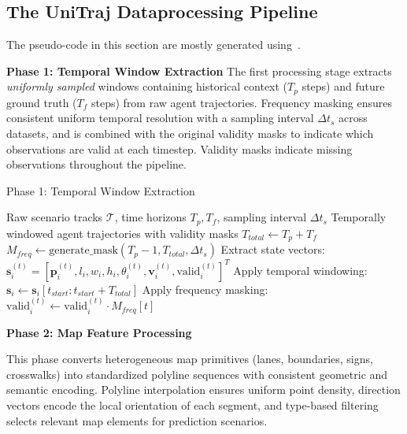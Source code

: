 \subsection{The UniTraj Dataprocessing Pipeline}
\label{app:framework}

The pseudo-code in this section are mostly generated using~\cite{copilotSonnet}.

\textbf{Phase 1: Temporal Window Extraction}
The first processing stage extracts \emph{uniformly sampled} windows containing historical context (\(T_p\) steps) and future ground truth (\(T_f\) steps) from raw agent trajectories. Frequency masking ensures consistent uniform temporal resolution with a sampling interval \(\Delta t_{s}\) across datasets, and is combined with the original validity masks to indicate which observations are valid at each timestep. Validity masks indicate missing observations throughout the pipeline.\\

\begin{algorithm}[H]
\caption{Phase 1: Temporal Window Extraction}
\label{alg:phase1_temporal}
\begin{algorithmic}[1]
\REQUIRE Raw scenario tracks \(\mathcal{T}\), time horizons \(T_p, T_f\), sampling interval \(\Delta t_{s}\)
\ENSURE Temporally windowed agent trajectories with validity masks
\STATE \(T_{total} \leftarrow T_p + T_f\) 
\STATE \(M_{freq} \leftarrow \text{generate\_mask}(T_p - 1, T_{total}, \Delta t_{s})\) 
    \STATE Extract state vectors: \(\boldsymbol{s}_i^{(t)} = [\boldsymbol{p}_i^{(t)}, l_i, w_i, h_i, \theta_i^{(t)}, \boldsymbol{v}_i^{(t)}, \text{valid}_i^{(t)}]^T\)
    \STATE Apply temporal windowing: \(\boldsymbol{s}_i \leftarrow \boldsymbol{s}_i[t_{start} : t_{start} + T_{total}]\)
    \STATE Apply frequency masking: \(\text{valid}_i^{(t)} \leftarrow \text{valid}_i^{(t)} \cdot M_{freq}[t]\)
\ENDFOR
\end{algorithmic}
\end{algorithm}

\textbf{Phase 2: Map Feature Processing}

This phase converts heterogeneous map primitives (lanes, boundaries, signs, crosswalks) into standardized polyline sequences with consistent geometric and semantic encoding. Polyline interpolation ensures uniform point density, direction vectors encode the local orientation of each segment, and type-based filtering selects relevant map elements for prediction scenarios.

